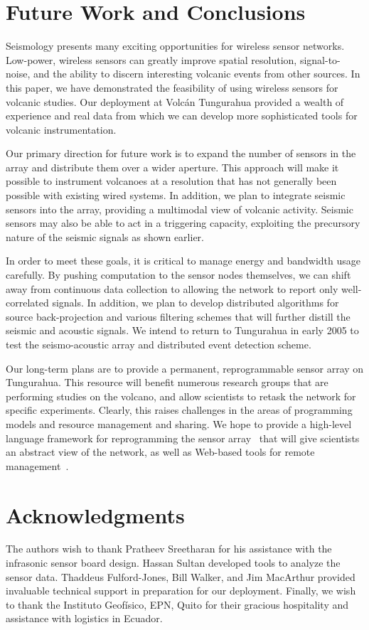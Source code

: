 \section{Future Work and Conclusions}
\label{sec-conclusions}

Seismology presents many exciting opportunities for wireless sensor 
networks. Low-power, wireless sensors can greatly improve spatial
resolution, signal-to-noise, and the ability to discern interesting
volcanic events from other sources. In this paper, we have demonstrated 
the feasibility of using wireless sensors for volcanic studies. Our 
deployment at Volc\'{a}n Tungurahua provided a wealth of experience
and real data from which we can develop more sophisticated tools for
volcanic instrumentation.

Our primary direction for future work is to expand the number of
sensors in the array and distribute them over a wider aperture.
This approach will make it possible to instrument volcanoes at a
resolution that has not generally been possible with existing wired
systems. In addition, we plan to integrate seismic sensors into the array,
providing a multimodal view of volcanic activity.  Seismic sensors may also
be able to act in a triggering capacity, exploiting the precursory nature of
the seismic signals as shown earlier.

In order to meet these goals, it is critical to manage energy and
bandwidth usage carefully. By pushing computation to the sensor nodes
themselves, we can shift away from continuous data collection to allowing
the network to report only well-correlated signals. In addition, we
plan to develop distributed algorithms for source back-projection and
various filtering schemes that will further distill the seismic and
acoustic signals.  We intend to return to Tungurahua in early 2005 to
test the seismo-acoustic array and distributed event detection scheme.

Our long-term plans are to provide a permanent, reprogrammable sensor
array on Tungurahua. This resource will benefit numerous research
groups that are performing studies on the volcano, and allow
scientists to retask the network for specific experiments. Clearly,
this raises challenges in the areas of programming models and resource
management and sharing. We hope to provide a high-level language
framework for reprogramming the sensor array~\cite{regiment-dmsn04}
that will give scientists an abstract view of the network, as well as
Web-based tools for remote management~\cite{motelab}.

\section*{Acknowledgments}

The authors wish to thank Pratheev Sreetharan for his assistance with
the infrasonic sensor board design. Hassan Sultan developed tools to
analyze the sensor data. Thaddeus Fulford-Jones, Bill Walker, and Jim
MacArthur provided invaluable technical support in preparation for our
deployment. Finally, we wish to thank the Instituto Geof\'{i}sico,
EPN, Quito for their gracious hospitality and assistance with
logistics in Ecuador.

